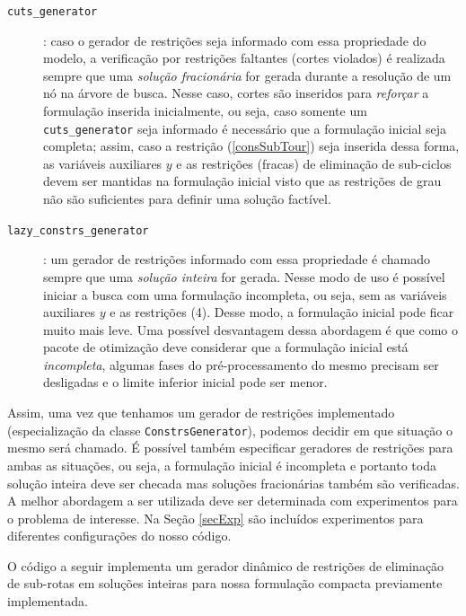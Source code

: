 \documentclass[a4paper,11pt,fleqn]{article}
\begin{document}
\begin{description}
	\item[\texttt{cuts\_generator}]: caso o gerador de restrições seja informado com essa propriedade do modelo, a verificação por restrições faltantes (cortes violados) é realizada sempre que uma \emph{solução fracionária} for gerada durante a resolução de um nó na árvore de busca. Nesse caso, cortes são inseridos para \emph{reforçar} a formulação inserida inicialmente, ou seja, caso somente um \texttt{cuts\_generator} seja informado é necessário que a formulação inicial seja completa; assim, caso a restrição (\ref{consSubTour}) seja inserida dessa forma, as variáveis auxiliares $y$ e as restrições (fracas) de eliminação de sub-ciclos devem ser mantidas na formulação inicial visto que as restrições de grau não são suficientes para definir uma solução factível.
	
	\item[\texttt{lazy\_constrs\_generator}]: um gerador de restrições informado com essa propriedade é chamado sempre que uma \emph{solução inteira} for gerada. Nesse modo de uso é possível iniciar a busca com uma formulação incompleta, ou seja, sem as variáveis auxiliares $y$ e as restrições (4). Desse modo, a formulação inicial pode ficar muito mais leve. Uma possível desvantagem dessa abordagem é que como o pacote de otimização deve considerar que a formulação inicial está \emph{incompleta}, algumas fases do pré-processamento do mesmo precisam ser desligadas e o limite inferior inicial pode ser menor.
\end{description}

Assim, uma vez que tenhamos um gerador de restrições implementado (especialização da classe \texttt{ConstrsGenerator}), podemos decidir em que situação o mesmo será chamado. É possível também especificar geradores de restrições para ambas as situações, ou seja, a formulação inicial é incompleta e portanto toda solução inteira deve ser checada mas soluções fracionárias também são verificadas. A melhor abordagem a ser utilizada deve ser determinada com experimentos para o problema de interesse. 
Na Seção \ref{secExp} são incluídos experimentos para diferentes configurações do nosso código.

O código a seguir implementa um gerador dinâmico de restrições de eliminação de sub-rotas em soluções inteiras para nossa formulação compacta previamente implementada. 
\end{document}
